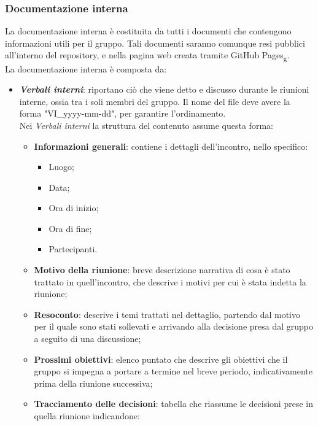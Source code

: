 \subsubsection{Documentazione interna}
La documentazione interna è costituita da tutti i documenti che contengono
informazioni utili per il gruppo. Tali documenti saranno comunque resi pubblici
all'interno del repository, e nella pagina web creata tramite GitHub
Pages\textsubscript{g}.\\ La documentazione interna è composta da:
\begin{itemize}
      \item \textit{\textbf{Verbali interni}}: riportano ciò che viene detto e discusso durante le riunioni interne, ossia tra i soli membri del gruppo.
            Il nome del file deve avere la forma "VI\_yyyy-mm-dd", per garantire l'ordinamento.
            \\Nei \textit{Verbali interni} la struttura del contenuto assume questa forma:
            \begin{itemize}
                  \item \textbf{Informazioni generali}: contiene i dettagli dell'incontro, nello specifico:
                        \begin{itemize}
                              \item Luogo;
                              \item Data;
                              \item Ora di inizio;
                              \item Ora di fine;
                              \item Partecipanti.
                        \end{itemize}
                  \item \textbf{Motivo della riunione}: breve descrizione narrativa di cosa è stato trattato in quell'incontro, che descrive i motivi per cui è stata indetta la riunione;
                  \item \textbf{Resoconto}: descrive i temi trattati nel dettaglio, partendo dal motivo per il quale sono stati sollevati e arrivando alla decisione presa dal gruppo a seguito di una discussione;
                  \item \textbf{Prossimi obiettivi}: elenco puntato che descrive gli obiettivi che il gruppo si impegna a portare a termine nel breve periodo, indicativamente prima della riunione successiva;
                  \item \textbf{Tracciamento delle decisioni}: tabella che riassume le decisioni prese in quella riunione indicandone:

\end{itemize}
\end{itemize}
